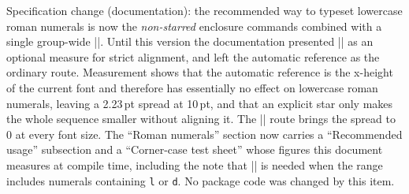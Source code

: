\documentclass[luatex,fontsize=8pt,paper=b5,twoside]{jlreq}%
\begin{document}
\begin{itemize}
  Specification change (documentation): the recommended way to typeset lowercase roman numerals is now the \emph{non-starred} enclosure commands combined with a single group-wide \KKverb||. Until this version the documentation presented \KKverb|| as an optional measure for strict alignment, and left the automatic reference as the ordinary route. Measurement shows that the automatic reference is the x-height of the current font and therefore has essentially no effect on lowercase roman numerals, leaving a 2.23\,pt spread at 10\,pt, and that an explicit star only makes the whole sequence smaller without aligning it. The \KKverb|| route brings the spread to 0 at every font size. The ``Roman numerals'' section now carries a ``Recommended usage'' subsection and a ``Corner-case test sheet'' whose figures this document measures at compile time, including the note that \KKverb|| is needed when the range includes numerals containing \verb|l| or \verb|d|. No package code was changed by this item.
\end{itemize}
\end{document}
